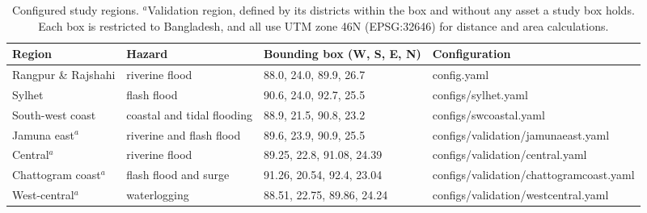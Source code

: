 \documentclass[10pt,a4paper,twocolumn]{article}
\makeatletter
\let\orig@texttt\texttt
\renewcommand{\texttt}[1]{%
  \ifmmode\text{\orig@texttt{#1}}\else
  \begingroup\ttfamily\def\_{\textunderscore\allowbreak}#1\endgroup\fi}
\newcommand{\fileref}[1]{\texttt{#1}}
\makeatother
\begin{document}
\begin{table}[tp]
\centering
\small
\begin{tabular}{llll}
\toprule
Region & Hazard & Bounding box (W, S, E, N) & Configuration \\
\midrule
Rangpur \& Rajshahi & riverine flood & 88.0, 24.0, 89.9, 26.7 & \fileref{config.yaml} \\
Sylhet & flash flood & 90.6, 24.0, 92.7, 25.5 & \fileref{configs/sylhet.yaml} \\
South-west coast & coastal and tidal flooding & 88.9, 21.5, 90.8, 23.2 & \fileref{configs/sw\_coastal.yaml} \\
Jamuna east$^{a}$ & riverine and flash flood & 89.6, 23.9, 90.9, 25.5 & \fileref{configs/validation/jamuna\_east.yaml} \\
Central$^{a}$ & riverine flood & 89.25, 22.8, 91.08, 24.39 & \fileref{configs/validation/central.yaml} \\
Chattogram coast$^{a}$ & flash flood and surge & 91.26, 20.54, 92.4, 23.04 & \fileref{configs/validation/chattogram\_coast.yaml} \\
West-central$^{a}$ & waterlogging & 88.51, 22.75, 89.86, 24.24 & \fileref{configs/validation/west\_central.yaml} \\
\bottomrule
\end{tabular}
\caption{Configured study regions. $^{a}$Validation region, defined by its districts within the box and without any asset a study box holds. Each box is restricted to Bangladesh, and all use UTM zone 46N (EPSG:32646) for distance and area calculations.}
\label{tab:regions}
\end{table}
\end{document}
